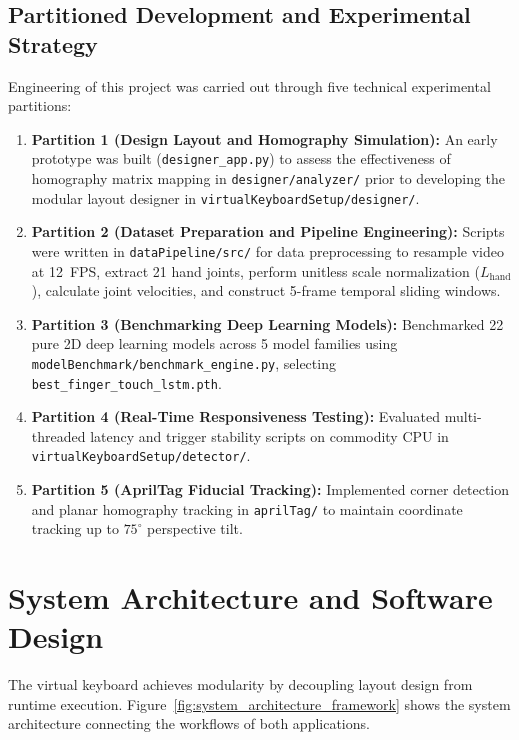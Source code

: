 \subsection{Partitioned Development and Experimental Strategy}
\label{subsec:meth_partitions}
Engineering of this project was carried out through five technical experimental partitions:
\begin{enumerate}
    \item \textbf{Partition 1 (Design Layout and Homography Simulation):} An early prototype was built (\texttt{designer\_app.py}) to assess the effectiveness of homography matrix mapping in \texttt{designer/analyzer/} prior to developing the modular layout designer in \texttt{virtualKeyboardSetup/designer/}.
    \item \textbf{Partition 2 (Dataset Preparation and Pipeline Engineering):} Scripts were written in \texttt{dataPipeline/src/} for data preprocessing to resample video at 12~FPS, extract 21 hand joints, perform unitless scale normalization ($L_{\text{hand}}$), calculate joint velocities, and construct 5-frame temporal sliding windows.
    \item \textbf{Partition 3 (Benchmarking Deep Learning Models):} Benchmarked 22 pure 2D deep learning models across 5 model families using \texttt{modelBenchmark/benchmark\_engine.py}, selecting \texttt{best\_finger\_touch\_lstm.pth}.
    \item \textbf{Partition 4 (Real-Time Responsiveness Testing):} Evaluated multi-threaded latency and trigger stability scripts on commodity CPU in \texttt{virtualKeyboardSetup/detector/}.
    \item \textbf{Partition 5 (AprilTag Fiducial Tracking):} Implemented corner detection and planar homography tracking in \texttt{aprilTag/} to maintain coordinate tracking up to $75^\circ$ perspective tilt.
\end{enumerate}

\section{System Architecture and Software Design}
\label{sec:meth_architecture}
The virtual keyboard achieves modularity by decoupling layout design from runtime execution. Figure~\ref{fig:system_architecture_framework} shows the system architecture connecting the workflows of both applications.

